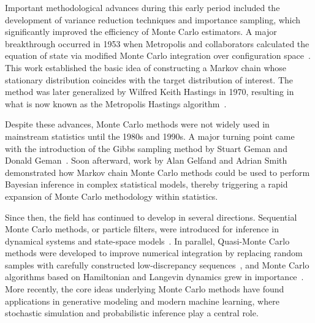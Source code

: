 Important methodological advances during this early period included the development of variance
reduction techniques and importance sampling, which significantly improved the efficiency of Monte
Carlo estimators. A major breakthrough occurred in 1953 when Metropolis and collaborators calculated
the equation of state via modified Monte Carlo integration over configuration space~\cite{162}. This
work established the basic idea of constructing a Markov chain whose stationary distribution
coincides with the target distribution of interest. The method was later generalized by Wilfred
Keith Hastings in 1970, resulting in what is now known as the Metropolis Hastings
algorithm~\cite{108}.

Despite these advances, Monte Carlo methods were not widely used in mainstream statistics until the
1980s and 1990s. A major turning point came with the introduction of the Gibbs sampling method by
Stuart Geman and Donald Geman~\cite{82}. Soon afterward, work by Alan Gelfand and Adrian
Smith~\cite{80} demonstrated how Markov chain Monte Carlo methods could be used to perform Bayesian
inference in complex statistical models, thereby triggering a rapid expansion of Monte Carlo
methodology within statistics.

Since then, the field has continued to develop in several directions. Sequential Monte Carlo
methods, or particle filters, were introduced for inference in dynamical systems and state-space
models~\cite{54,49}. In parallel, Quasi-Monte Carlo methods were developed to improve numerical
integration by replacing random samples with carefully constructed low-discrepancy
sequences~\cite{174}, and Monte Carlo algorithms based on Hamiltonian and Langevin dynamics grew in
importance~\cite{60,171,20,203}. More recently, the core ideas underlying Monte Carlo methods have
found applications in generative modeling and modern machine learning, where stochastic simulation
and probabilistic inference play a central role.
